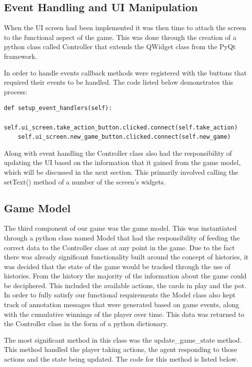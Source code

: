 \subsection{Event Handling and UI Manipulation}\label{subsec:eventHandling}
When the UI screen had been implemented it was then time to attach the screen to the
functional aspect of the game.
This was done through the creation of a python class called Controller that extends the QWidget
class from the PyQt framework.

In order to handle events callback methods were registered with the buttons that required their events to be handled.
The code listed below demonstrates this process:

\begin{lstlisting}[style=Python]
def setup_event_handlers(self):
    self.ui_screen.take_action_button.clicked.connect(self.take_action)
    self.ui_screen.new_game_button.clicked.connect(self.new_game)
\end{lstlisting}

Along with event handling the Controller class also had the responsibility of updating the
UI based on the information that it gained from the game model, which will be discussed in the next section.
This primarily involved calling the setText() method of a number of the screen's widgets.

\subsection{Game Model}\label{subsec:gameModel}
The third component of our game was the game model.
This was instantiated through a python class named Model that had the responsibility of feeding
the correct data to the Controller class at any point in the game.
Due to the fact there was already significant functionality built around the concept of histories,
it was decided that the state of the game would be tracked through the use of histories.
From the history the majority of the information about the game could be deciphered.
This included the available actions, the cards in play and the pot.
In order to fully satisfy our functional requirements the Model class also kept track of annotation messages
that were generated based on game events, along with the cumulative winnings of the player over time.
This data was returned to the Controller class in the
form of a python dictionary.

The most significant method in this class was the update\_game\_state method.
This method handled the player taking actions, the agent responding to those actions and the state being
updated.
The code for this method is listed below.

